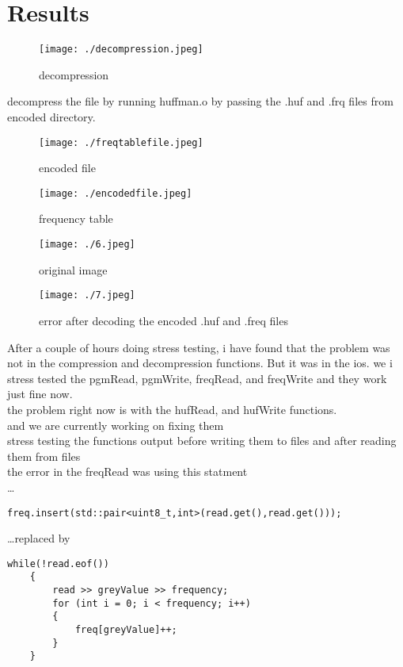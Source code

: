 \documentclass[14 pt,a4paper,double column]{article}
\begin{document}
\section{Results}
\begin{figure}[H] 
\texttt{[image: ./decompression.jpeg]}
\caption{decompression}
\end{figure}
decompress the file by running huffman.o by passing the .huf and .frq files from encoded directory.
\begin{figure}[H] 
\texttt{[image: ./freqtablefile.jpeg]}
\caption{encoded file}
\end{figure}
\begin{figure}[H] 
\texttt{[image: ./encodedfile.jpeg]}
\caption{frequency table}
\end{figure}
\begin{figure}[H]
\texttt{[image: ./6.jpeg]}
\caption{original image}
\end{figure}
\begin{figure}[H]
\texttt{[image: ./7.jpeg]}
\caption{error after decoding the encoded .huf and .freq files}

\end{figure}
After a couple of hours doing stress testing, i have found that the problem was not in the compression and decompression functions. But it was in the ios.
we i stress tested the pgmRead, pgmWrite, freqRead, and freqWrite and they work just fine now.\\
the problem right now is with the hufRead, and hufWrite functions.\\
and we are  currently working on fixing them\\
stress testing the functions output before writing them to files and after reading them from files\\
the error in the freqRead was using this statment\\
 \dots
\begin{lstlisting}
freq.insert(std::pair<uint8_t,int>(read.get(),read.get()));\end{lstlisting}
\dots  replaced by 
\begin{lstlisting}
while(!read.eof())
    {
        read >> greyValue >> frequency;
        for (int i = 0; i < frequency; i++)
        {
            freq[greyValue]++;
        }
    }
\end{lstlisting}
\end{document}
